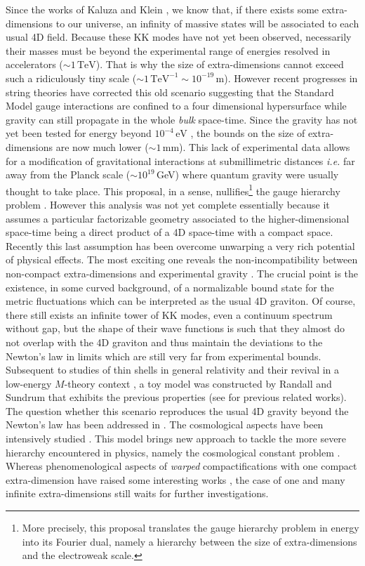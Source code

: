 \documentclass[a4paper,12pt]{article}
\begin{document}
Since the works of Kaluza and Klein \cite{KK}, we know that, if
there exists some extra-dimensions
to our universe,
an infinity of massive states will be associated to each usual
4D field. Because these KK modes have not yet been observed, necessarily
their masses must be beyond the experimental range of energies resolved in
accelerators ($\sim 1\, \mbox{TeV}$). That is why the size of extra-dimensions cannot
exceed such a ridiculously tiny scale ($\sim 1\, \mbox{TeV}^{-1}
\sim 10^{-19}\, \mbox{m}$).
However recent progresses in string theories \cite{Strings} have corrected this old
scenario suggesting that the Standard Model gauge interactions are
confined to a four dimensional hypersurface while gravity can still propagate
in the whole {\it bulk} space-time. Since the gravity has not yet been tested
for energy beyond $10^{-4}\, \mbox{eV}$ \cite{Gravity Exp},
the bounds on the size of extra-dimensions
are now much lower ($\sim 1\, \mbox{mm}$). This lack of experimental
data allows for a modification of gravitational interactions at submillimetric
distances {\it i.e.} far away from the Planck scale ($\sim 10^{19}\,$GeV) where
quantum gravity were usually thought to take place. This proposal, in a sense,
nullifies\footnote{More precisely, this proposal translates the gauge hierarchy
problem in energy into its Fourier dual, namely a hierarchy between the size of
extra-dimensions and the electroweak scale.} the gauge hierarchy problem \cite{AADD}.
However this analysis was not yet complete essentially because it assumes
a particular factorizable geometry associated to the higher-dimensional space-time
being a direct product of a 4D space-time with a compact space.
Recently this last assumption has been overcome \cite{RS} unwarping
a very rich potential of physical effects. The most exciting one reveals
the non-incompatibility between non-compact extra-dimensions and experimental
gravity \cite{LR}. The crucial point is the existence, in some curved background,
of a normalizable bound state for the metric fluctuations which can be interpreted as the usual
4D graviton. Of course, there still exists an infinite tower of KK modes, even
a continuum spectrum without gap, but the shape of their wave functions
is such that they almost do not overlap with the 4D graviton and thus maintain
the deviations to the Newton's law in limits which are still very far from
experimental bounds. Subsequent to studies of thin shells in general relativity
\cite{Shell} and their revival in a low-energy $M$-theory context \cite{Mtheory},
a toy model was constructed by Randall and Sundrum that
exhibits the previous properties (see \cite{beforeRS} for previous related works).
The question whether this scenario reproduces
the usual 4D gravity beyond the Newton's law has been addressed in
\cite{RSGravity}. The cosmological aspects have been intensively studied
\cite{RSCosmo}. This model brings new approach to tackle the more
severe hierarchy encountered in physics, namely the cosmological constant problem
\cite{CsteCosmo, CGS3}. Whereas phenomenological aspects of {\it warped} compactifications
with one compact extra-dimension have raised some interesting works \cite{RSpheno},
the case of one and many infinite extra-dimensions still waits for further investigations.
\end{document}

